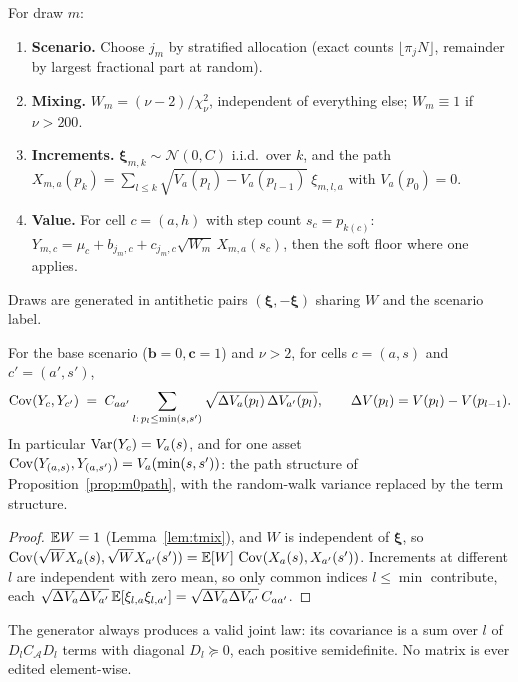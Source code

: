 For draw $m$:
\begin{enumerate}[leftmargin=*]
\item \textbf{Scenario.} Choose $j_m$ by stratified allocation (exact counts $\lfloor\pi_jN\rfloor$, remainder by largest fractional part at random).
\item \textbf{Mixing.} $W_m=(\nu-2)/\chi^2_\nu$, independent of everything else; $W_m\equiv1$ if $\nu>200$.
\item \textbf{Increments.} $\bm\xi_{m,k}\sim\mathcal N(0,C)$ i.i.d.\ over $k$, and the path
$X_{m,a}(p_k)=\sum_{l\le k}\sqrt{V_a(p_l)-V_a(p_{l-1})}\;\xi_{m,l,a}$ with $V_a(p_0)=0$.
\item \textbf{Value.} For cell $c=(a,h)$ with step count $s_c=p_{k(c)}$:
$Y_{m,c}=\mu_c+b_{j_m,c}+c_{j_m,c}\sqrt{W_m}\,X_{m,a}(s_c)$, then the soft floor where one applies.
\end{enumerate}
Draws are generated in antithetic pairs $(\bm\xi,-\bm\xi)$ sharing $W$ and the scenario label.

\begin{proposition}\label{prop:pathcov}
For the base scenario ($\bm b=0,\bm c=1$) and $\nu>2$, for cells $c=(a,s)$ and $c'=(a',s')$,
\begin{equation}
  \operatorname{Cov}(Y_c,Y_{c'}) \;=\; C_{aa'}\sum_{l:\,p_l\le\min(s,s')}\sqrt{\Delta V_a(p_l)\,\Delta V_{a'}(p_l)},\qquad \Delta V(p_l)=V(p_l)-V(p_{l-1}).
\end{equation}
In particular $\operatorname{Var}(Y_c)=V_a(s)$, and for one asset $\operatorname{Cov}(Y_{(a,s)},Y_{(a,s')})=V_a(\min(s,s'))$: the path structure of
Proposition~\ref{prop:m0path}, with the random-walk variance replaced by the term structure.
\end{proposition}
\begin{proof}
$\mathbb{E} W=1$ (Lemma~\ref{lem:tmix}), and $W$ is independent of $\bm\xi$, so $\operatorname{Cov}(\sqrt W X_{a}(s),\sqrt W X_{a'}(s'))=\mathbb{E}[W]\,\operatorname{Cov}(X_a(s),X_{a'}(s'))$.
Increments at different $l$ are independent with zero mean, so only common indices $l\le\min$ contribute, each
$\sqrt{\Delta V_a\Delta V_{a'}}\,\mathbb{E}[\xi_{l,a}\xi_{l,a'}]=\sqrt{\Delta V_a\Delta V_{a'}}\,C_{aa'}$.
\end{proof}

\begin{corollary}[Validity]
The generator always produces a valid joint law: its covariance is a sum over $l$ of $D_l C_{\mathcal A} D_l$ terms with diagonal $D_l\succeq0$,
each positive semidefinite. No matrix is ever edited element-wise.
\end{corollary}

